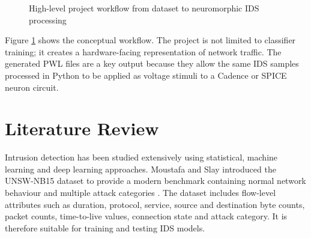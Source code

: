 \begin{figure}[H]
\centering
{}
\caption{High-level project workflow from dataset to neuromorphic IDS processing}
\label{fig:overallworkflow}
\end{figure}

Figure \ref{fig:overallworkflow} shows the conceptual workflow. The project is not limited to classifier training; it creates a hardware-facing representation of network traffic. The generated PWL files are a key output because they allow the same IDS samples processed in Python to be applied as voltage stimuli to a Cadence or SPICE neuron circuit.

\section[Literature Review]{\textbf{Literature Review}}

Intrusion detection has been studied extensively using statistical, machine learning and deep learning approaches. Moustafa and Slay introduced the UNSW-NB15 dataset to provide a modern benchmark containing normal network behaviour and multiple attack categories \cite{Moustafa2015}. The dataset includes flow-level attributes such as duration, protocol, service, source and destination byte counts, packet counts, time-to-live values, connection state and attack category. It is therefore suitable for training and testing IDS models.

